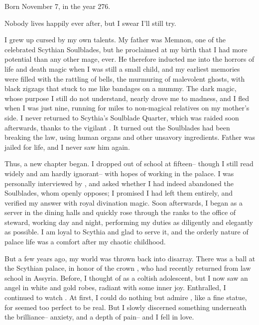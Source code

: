 \documentclass[char]{Kos}
\begin{document}
\name{\cButler{}}

Born November 7, in the year 276.

Nobody lives happily ever after, but I swear I'll still try.

I grew up cursed by my own talents. My father was Memnon, one of the celebrated Scythian Soulblades, but he proclaimed at my birth that I had more potential than any other mage, ever. He therefore inducted me into the horrors of life and death magic when I was still a small child, and my earliest memories were filled with the rattling of bells, the murmuring of malevolent ghosts, with black zigzags that stuck to me like bandages on a mummy. The dark magic, whose purpose I still do not understand, nearly drove me to madness, and I fled when I was just nine, running for miles to non-magical relatives on my mother's side. I never returned to Scythia's Soulblade Quarter, which was raided soon afterwards, thanks to the vigilant \cScythiaQueen{\Monarch} \cScythiaQueen{}. It turned out the Soulblades had been breaking the law, using human organs and other unsavory ingredients. Father was jailed for life, and I never saw him again.

Thus, a new chapter began. I dropped out of school at fifteen-- though I still read widely and am hardly ignorant-- with hopes of working in the palace. I was personally interviewed by\cScythiaQueen{\Monarch} \cScythiaQueen{}, and \cScythiaQueen{\they} asked whether I had indeed abandoned the Soulblades, whom \cScythiaQueen{\they} openly opposes; I promised I had left them entirely, and \cScythiaQueen{\they} verified my answer with royal divination magic. Soon afterwards, I began as a server in the dining halls and quickly rose through the ranks to the office of steward, working day and night, performing my duties as diligently and elegantly as possible. I am loyal to Scythia and glad to serve it, and the orderly nature of palace life was a comfort after my chaotic childhood.

But a few years ago, my world was thrown back into disarray. There was a ball at the Scythian palace, in honor of the crown \cBride{\prince} \cBride{}, who had recently returned from law school in Assyria. Before, I thought of \cBride{\them} as a coltish adolescent, but I now saw an angel in white and gold robes, radiant with some inner joy. Enthralled, I continued to watch \cBride{\them}. At first, I could do nothing but admire \cBride{\them}, like a fine statue, for \cBride{\they} seemed too perfect to be real. But I slowly discerned something underneath the brilliance-- anxiety, and a depth of pain-- and I fell in love. 
\end{document}
